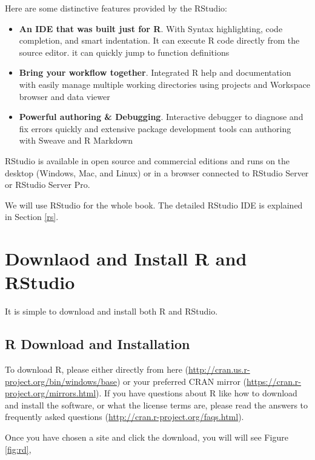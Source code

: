 \documentclass[
]{book}
\providecommand{\tightlist}{%
  \setlength{\itemsep}{0pt}\setlength{\parskip}{0pt}}
\begin{document}
Here are some distinctive features provided by the RStudio:

\begin{itemize}
\tightlist
\item
  \textbf{An IDE that was built just for R}. With Syntax highlighting, code completion, and smart indentation. It can execute R code directly from the source editor. it can quickly jump to function definitions
\item
  \textbf{Bring your workflow together}. Integrated R help and documentation with easily manage multiple working directories using projects and Workspace browser and data viewer
\item
  \textbf{Powerful authoring \& Debugging}. Interactive debugger to diagnose and fix errors quickly and extensive package development tools can authoring with Sweave and R Markdown
\end{itemize}

RStudio is available in open source and commercial editions and runs on the desktop (Windows, Mac, and Linux) or in a browser connected to RStudio Server or RStudio Server Pro.

We will use RStudio for the whole book. The detailed RStudio IDE is explained in Section \ref{rs}.

\hypertarget{downlaod-and-install-r-and-rstudio}{%
\section{Downlaod and Install R and RStudio}\label{downlaod-and-install-r-and-rstudio}}

It is simple to download and install both R and RStudio.

\hypertarget{r-download-and-installation}{%
\subsection{R Download and Installation}\label{r-download-and-installation}}

To download R, please either directly from here (\url{http://cran.us.r-project.org/bin/windows/base}) or your preferred CRAN mirror (\url{https://cran.r-project.org/mirrors.html}). If you have questions about R like how to download and install the software, or what the license terms are, please read the answers to frequently asked questions (\url{http://cran.r-project.org/faqs.html}).

Once you have chosen a site and click the download, you will will see Figure \ref{fig:rd},
\end{document}
